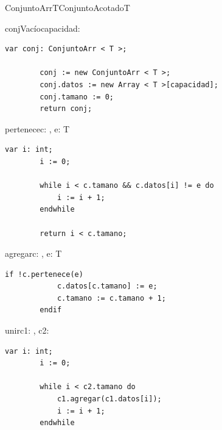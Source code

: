\begin{module}{ConjuntoArr}{T}{ConjuntoAcotado}{T}




	\begin{proc}{conjVacío}{\In capacidad: \Int}{\moduletype}
		\begin{lstlisting}[numbers=none,frame=none]
		var conj: ConjuntoArr < T >;

		conj := new ConjuntoArr < T >;
		conj.datos := new Array < T >[capacidad];
		conj.tamano := 0;
		return conj;
		\end{lstlisting}
	\end{proc}

	\begin{proc}{pertenece}{\In c: \moduletype, \In e: T}{\bool}
		\begin{lstlisting}[numbers=none,frame=none]
		var i: int;
		i := 0;

		while i < c.tamano && c.datos[i] != e do
			i := i + 1;
		endwhile

		return i < c.tamano;
		\end{lstlisting}
	\end{proc}

	\begin{proc}{agregar}{\Inout c: \moduletype, \In e: T}{}
		\begin{lstlisting}[numbers=none,frame=none]
		if !c.pertenece(e)
			c.datos[c.tamano] := e;
			c.tamano := c.tamano + 1;
		endif
		\end{lstlisting}
	\end{proc}

	\begin{proc}{unir}{\Inout c1: \moduletype, \In c2: \moduletype}{}
		\begin{lstlisting}[numbers=none,frame=none]
		var i: int;
		i := 0;

		while i < c2.tamano do
			c1.agregar(c1.datos[i]);
			i := i + 1;
		endwhile
		\end{lstlisting}
	\end{proc}


\end{module}
